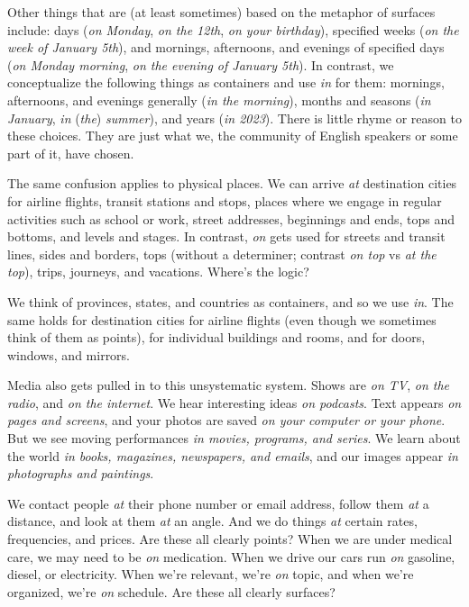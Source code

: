 Other things that are (at least sometimes) based on the metaphor of surfaces include: days (\textit{on Monday}, \textit{on the 12th}, \textit{on your birthday}), specified weeks (\textit{on the
week of January 5th}), and mornings, afternoons, and evenings of specified days
(\textit{on Monday morning}, \textit{on the evening of January 5th}). In contrast, we conceptualize
the following things as containers and use \textit{in} for them: mornings, afternoons, and
evenings generally (\textit{in the morning}), months and seasons (\textit{in January}, \textit{in }(\textit{the})\textit{ summer}), and years (\textit{in 2023}). There is little rhyme or reason to these choices.
They are just what we, the community of English speakers or some part of it,
have chosen.

The same confusion applies to physical places. We can arrive \textit{at} destination
cities for airline flights, transit stations and stops, places where we engage in
regular activities such as school or work, street addresses, beginnings and ends,
tops and bottoms, and levels and stages. In contrast, \textit{on} gets used for streets and
transit lines, sides and borders, tops (without a determiner; contrast \textit{on top} vs \textit{at
the top}), trips, journeys, and vacations. Where's the logic?

We think of provinces, states, and countries as containers, and so we use \textit{in}.
The same holds for destination cities for airline flights (even though we sometimes think of them as points), for individual buildings and rooms, and for doors,
windows, and mirrors.

Media also gets pulled in to this unsystematic system. Shows are \textit{on TV}, \textit{on
the radio}, and \textit{on the internet}. We hear interesting ideas \textit{on podcasts}. Text appears
\textit{on pages and screens}, and your photos are saved \textit{on your computer or your phone}.
But we see moving performances \textit{in movies, programs, and series}. We learn about
the world \textit{in books, magazines, newspapers, and emails}, and our images appear \textit{in
photographs and paintings}.

We contact people \emph{at} their phone number or email address, follow them \emph{at} a
distance, and look at them \emph{at} an angle. And we do things \emph{at} certain rates, frequencies, and prices. Are these all clearly points? When we are under medical
care, we may need to be \emph{on} medication. When we drive our cars run \emph{on} gasoline, diesel, or electricity. When we're relevant, we're \emph{on} topic, and when we're
organized, we're \emph{on} schedule. Are these all clearly surfaces? 

